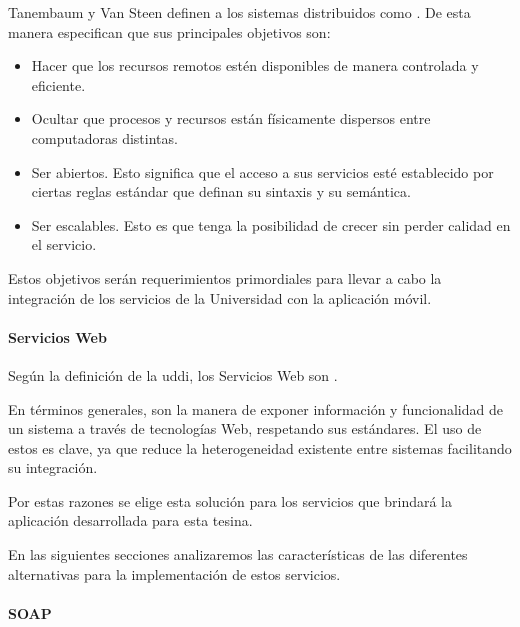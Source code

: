 Tanembaum y Van Steen definen a los sistemas distribuidos como \cite[p.~2]{tanenbaum2007distributed}. De esta manera especifican que sus principales objetivos son:

\begin{itemize}
\item Hacer que los recursos remotos estén disponibles de manera controlada y eficiente.
\item Ocultar que procesos y recursos están físicamente dispersos entre computadoras distintas.
\item Ser abiertos. Esto significa que el acceso a sus servicios esté establecido por ciertas reglas estándar que definan su sintaxis y su semántica.
\item Ser escalables. Esto es que tenga la posibilidad de crecer sin perder calidad en el servicio.
\end{itemize}

Estos objetivos serán requerimientos primordiales para llevar a cabo la integración de los servicios de la Universidad con la aplicación móvil.

\paragraph{Servicios Web}
\label{servicios_web}

Según la definición de la \gls{uddi}, los Servicios Web son \cite{uddi2001uddi}.

En términos generales, son la manera de exponer información y funcionalidad de un sistema a través de tecnologías Web, respetando sus estándares. El uso de estos es clave, ya que reduce la heterogeneidad existente entre sistemas facilitando su integración\cite{alonso2004web}.

Por estas razones se elige esta solución para los servicios que brindará la aplicación desarrollada para esta tesina.

En las siguientes secciones analizaremos las características de las diferentes alternativas para la implementación de estos servicios.

\paragraph{SOAP}
\label{soap}

